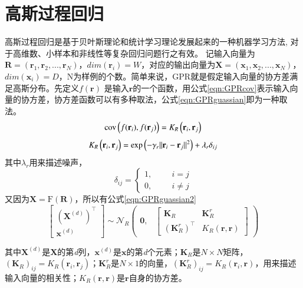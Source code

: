 \section{高斯过程回归}
高斯过程回归是基于贝叶斯理论和统计学习理论发展起来的一种机器学习方法, 对于高维数、小样本和非线性等复杂回归问题行之有效。
记输入向量为$\mathbf{R}=(\mathbf{r}_1,\mathbf{r}_2,...,\mathbf{r}_N)$，$dim(\mathbf{r}_i)=W$，对应的输出向量为$\mathbf{X}=(\mathbf{x}_1,\mathbf{x}_2,...,\mathbf{x}_N)$，$dim(\mathbf{x}_i)=D$，N为样例的个数。简单来说，GPR就是假定输入向量的协方差满足高斯分布。先定义$f(\mathbf{r})$ 是输入$\mathbf{r}$的一个函数，用公式\ref{eqn:GPRcov}表示输入向量的协方差，协方差函数可以有多种取法，公式\ref{eqn:GPRguassian}即为一种取法。
  \begin{equation}
  \textmd{cov}\left(f(\mathbf{r}_i),f(\mathbf{r}_j)\right) = K_R\left(\mathbf{r}_i,\mathbf{r}_j\right)\label{eqn:GPRcov}
  \end{equation}
  \begin{equation}
    K_R\left(\mathbf{r}_i,\mathbf{r}_j\right)= \textmd{exp}\left(-\gamma_r||\mathbf{r}_i-\mathbf{r}_j||^2\right)+\lambda_r\delta_{ij}\label{eqn:GPRguassian}
  \end{equation}
其中$\lambda_r$用来描述噪声，
\begin{equation}
  \delta_{ij}=\begin{cases}1,\hspace{1cm}i=j \\ 0,\hspace{1cm}i\neq j  \end{cases}
\end{equation}
又因为$\mathbf{X}=\textrm{F}(\mathbf{R})$，所以有公式\ref{eqn:GPRguassian2}
\begin{equation}\label{eqn:GPRguassian2}
  \begin{bmatrix} {(\mathbf{X}^{(d)})}^\top \\ \mathbf{x}^{(d)} \end{bmatrix}
  \sim \mathcal{N}_R
  \begin{pmatrix}
    \mathbf{0},& \begin{bmatrix} \mathbf{K}_R & \mathbf{K}_R^r \\ {\left(\mathbf{K}_R^r\right)}^\top & K_R(\mathbf{r},\mathbf{r}) \end{bmatrix}
  \end{pmatrix}
\end{equation}

其中$\mathbf{X}^{(d)}$是$\mathbf{X}$的第\emph{d}列，$\mathbf{x}^{(d)}$是$\mathbf{x}$的第\emph{d}个元素；$\mathbf{K}_R$是$N\times N$矩阵，$(\mathbf{K}_R)_{ij}=K_R(\mathbf{r}_i,\mathbf{r}_j)$；$\mathbf{K}_R^r$是$N\times 1$的向量，$\left(\mathbf{K}_R^r\right)_{ij}=K_R(\mathbf{r}_i,\mathbf{r})$，用来描述输入向量的相关性；$K_R(\mathbf{r},\mathbf{r})$是$\mathbf{r}$自身的协方差。

